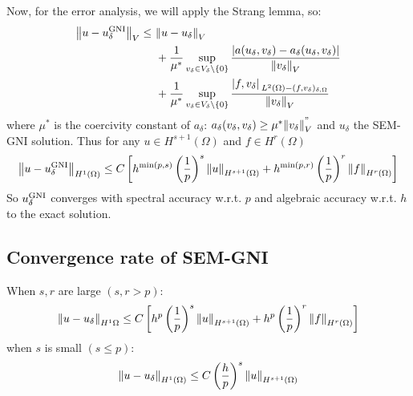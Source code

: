 Now, for the error analysis, we will apply the Strang lemma, so:
\begin{align*}
    \norm{u- u _\delta^{\text{GNI}}}_V \leq \ & \norm{u-u_\delta}_V \\
    & + \frac{1}{\mu^*} \sup_{v_\delta \in V_\delta \backslash\left\{ 0 \right\}} \frac{\abs{a(u_\delta, v_\delta) - a_\delta(u_\delta, v_\delta)}}{\norm{v_\delta}_V} \\
    & + \frac{1}{\mu^*} \sup_{v_\delta \in V_\delta \backslash\left\{ 0 \right\}} \frac{\abs*{f,v_\delta}_{L^2(\Omega) - (f,v_\delta)_{\delta,\Omega}}}{\norm{v_\delta}_V}
\end{align*}
where \(\mu^*\) is the coercivity constant of \(a_\delta\): \(a_\delta(v_\delta, v_\delta) \geq \mu^*\norm{v_\delta}^"_V\) and \(u_\delta\) the SEM-GNI solution.
Thus for any \(u \in H^{s+1}(\Omega)\) and \(f \in H^r(\Omega)\) 
\[
    \norm{u-u_\delta^{\text{GNI}}}_{H^1(\Omega)} \leq C\left[ h^{\min(p,s)}\left( \frac{1}{p} \right)^s \norm{u}_{H^{s+1}(\Omega)} + h^{\min(p,r)}\left( \frac{1}{p} \right)^r \norm{f}_{H^{r}(\Omega)}  \right]
\]
So \(u_\delta^{\text{GNI}}\) converges with spectral accuracy w.r.t. \(p\) and algebraic accuracy w.r.t. \(h\) to the exact solution.
\subsection{Convergence rate of SEM-GNI}
When \(s,r\) are large \((s, r > p)\):
\[
    \norm{u-u_\delta}_{H^1{\Omega}} \leq C \left[ h^p \left(\frac{1}{p}\right)^s \norm{u}_{H^{s+1}(\Omega)} + h^p \left(\frac{1}{p}\right)^r \norm{f}_{H^{r}(\Omega)}  \right]
\]
when \(s\) is small \((s \leq p)\):
\[
    \norm{u-u_\delta}_{H^1(\Omega)} \leq C\left( \frac{h}{p} \right)^s \norm{u}_{H^{s+1}(\Omega)}
\]
